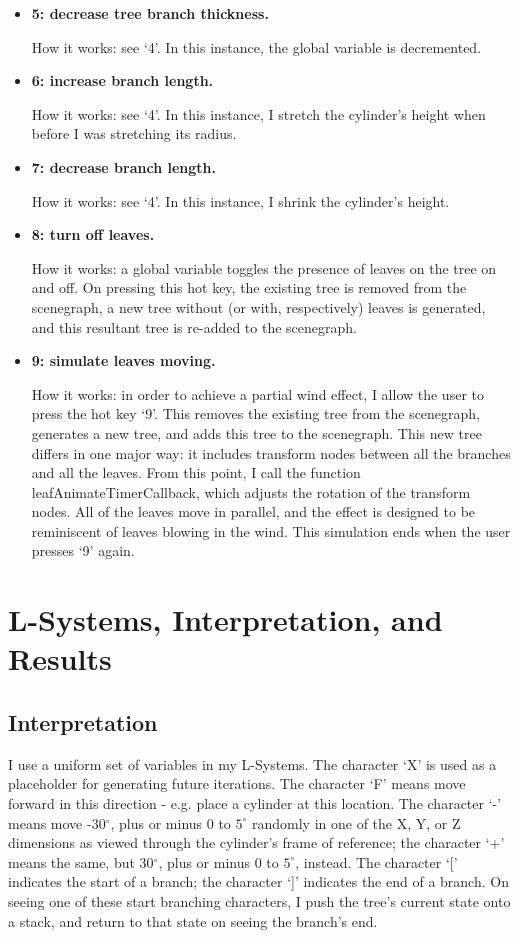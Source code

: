 \documentclass[11pt]{article} %
\begin{document}
\begin{itemize}
\item \textbf{ 5: decrease tree branch thickness. }

How it works: see `4'. In this instance, the global variable is decremented. 

\item \textbf{ 6: increase branch length. } 

How it works: see `4'. In this instance, I stretch the cylinder's height when before I was stretching its radius. 

\item \textbf{ 7: decrease branch length. } 

How it works: see `4'. In this instance, I shrink the cylinder's height. 

\item \textbf{8: turn off leaves. }

How it works: a global variable toggles the presence of leaves on the tree on and off. On pressing this hot key, the existing tree is removed from the scenegraph, a new tree without (or with, respectively) leaves is generated, and this resultant tree is re-added to the scenegraph. 

\item \textbf{9: simulate leaves moving. }

How it works: in order to achieve a partial wind effect, I allow the user to press the hot key `9'. This removes the existing tree from the scenegraph, generates a new tree, and adds this tree to the scenegraph. This new tree differs in one major way: it includes transform nodes between all the branches and all the leaves.  From this point, I call the function leafAnimateTimerCallback, which adjusts the rotation of the transform nodes. All of the leaves move in parallel, and the effect is designed to be reminiscent of leaves blowing in the wind. This simulation ends when the user presses `9' again. 

\end{itemize} 

\section{L-Systems, Interpretation, and Results} 

\subsection{Interpretation} 

I use a uniform set of variables in my L-Systems. The character `X' is used as a placeholder for generating future iterations. The character `F' means move forward in this direction - e.g. place a cylinder at this location. The character `-' means move -30$^\circ$, plus or minus $0$ to $5^\circ$ randomly in one of the X, Y, or Z dimensions as viewed through the cylinder's frame of reference; the character `+' means the same, but 30$^\circ$, plus or minus $0$ to $5^\circ$, instead. The character `[' indicates the start of a branch; the character `]' indicates the end of a branch. On seeing one of these start branching characters, I push the tree's current state onto a stack, and return to that state on seeing the branch's end.
\end{document}
